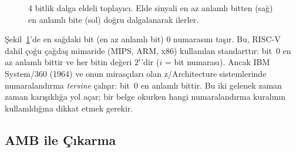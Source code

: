 \begin{figure}[htbp]
\centering
{}
\caption[4 bitlik dalga eldeli toplay{\i}c{\i}]{4 bitlik dalga eldeli toplay{\i}c{\i}. Elde sinyali en az anlaml{\i} bitten (sa\u{g}) en anlaml{\i} bite (sol) do\u{g}ru dalgalanarak ilerler.}
\label{fig:4bit-toplayici}
\end{figure}

\FloatBarrier
\begin{bilginot}
Şekil~\ref{fig:4bit-toplayici}'de en sağdaki bit (en az anlamlı bit) 0 numarasını taşır. Bu, RISC-V dahil çoğu çağdaş mimaride (MIPS, ARM, x86) kullanılan standarttır: bit~0 en az anlamlı bittir ve her bitin değeri $2^i$'dir ($i$ = bit numarası). Ancak IBM System/360 (1964) ve onun mirasçıları olan z/Architecture sistemlerinde numaralandırma \emph{tersine} çalışır: bit~0 en anlamlı bittir. Bu iki gelenek zaman zaman karışıklığa yol açar; bir belge okurken hangi numaralandırma kuralının kullanıldığına dikkat etmek gerekir.
\end{bilginot}

\subsection{AMB ile Çıkarma}
\label{sec:amb-ile-cikarma}

